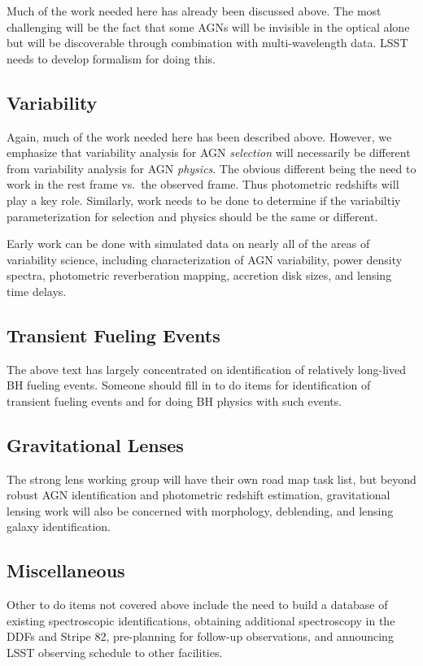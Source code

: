 Much of the work needed here has already been discussed above.  The most challenging will be the fact that some AGNs will be invisible in the optical alone but will be discoverable through combination with multi-wavelength data.  LSST needs to develop formalism for doing this.

\subsection{Variability}

Again, much of the work needed here has been described above.  However, we emphasize that variability analysis for AGN {\em selection} will necessarily be different from variability analysis for AGN {\em physics}.  The obvious different being the need to work in the rest frame vs.\ the observed frame.  Thus photometric redshifts will play a key role.  Similarly, work needs to be done to determine if the variabiltiy parameterization for selection and physics should be the same or different.

Early work can be done with simulated data on nearly all of the areas of variability science, including characterization of AGN variability, power density spectra, photometric reverberation mapping, accretion disk sizes, and lensing time delays.

\subsection{Transient Fueling Events}

The above text has largely concentrated on identification of relatively long-lived BH fueling events.  Someone should fill in to do items for identification of transient fueling events and for doing BH physics with such events.

\subsection{Gravitational Lenses}

The strong lens working group will have their own road map task list, but beyond robust AGN identification and photometric redshift estimation, gravitational lensing work will also be concerned with morphology, deblending, and lensing galaxy identification.


\subsection{Miscellaneous}

Other to do items not covered above include the need to build a database of existing spectroscopic identifications, obtaining additional spectroscopy in the DDFs and Stripe 82, pre-planning for follow-up observations, and  announcing LSST observing schedule to other facilities.





